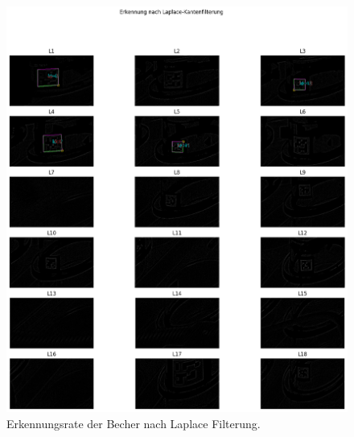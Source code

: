     \begin{figure}
        \caption[Erkennungsrate nach Laplace Filterung]{\small Erkennungsrate der Becher nach Laplace Filterung.}\label{fig:figure24}
        \includegraphics[width = \textwidth]{Bilder/ErkennungsrateLaplace.png}
        \centering
    \end{figure}

